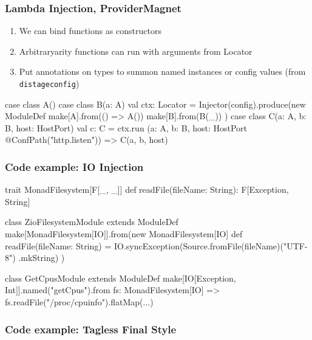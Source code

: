 \documentclass[usenames,dvipsnames]{beamer}
\begin{document}
\begin{frame}[fragile]
\frametitle{Lambda Injection, ProviderMagnet}
\begin{enumerate}
\item We can bind functions as constructors
\item Arbitrary\-arity functions can run with arguments from Locator
\item Put annotations on types to summon named instances or config values (from \texttt{distage\-config})
\end{enumerate}
\begin{scalacode}
case class A()
case class B(a: A)
val ctx: Locator = Injector(config).produce(new ModuleDef { 
  make[A].from(() => A())
  make[B].from(B(_))
})
case class C(a: A, b: B, host: HostPort)
val c: C = ctx.run {
  (a: A, b: B, host: HostPort @ConfPath("http.listen")) =>
    C(a, b, host)
}
\end{scalacode}
\end{frame}

\begin{frame}[fragile]
\frametitle{Code example: IO Injection}
\begin{enumerate}
\begin{scalacode}
trait MonadFilesystem[F[_, _]] {
  def readFile(fileName: String): F[Exception, String]
}

class ZioFilesystemModule extends ModuleDef {
  make[MonadFilesystem[IO]].from(new MonadFilesystem[IO] {
    def readFile(fileName: String) = 
      IO.syncException(Source.fromFile(fileName)("UTF-8")
        .mkString) 
  })
}

class GetCpusModule extends ModuleDef {
  make[IO[Exception, Int]].named("getCpus").from {
    fs: MonadFilesystem[IO] =>
      fs.readFile("/proc/cpuinfo").flatMap(...)
  }
}
\end{scalacode}
\end{enumerate}
\end{frame}

\begin{frame}[fragile]
\frametitle{Code example: Tagless Final Style}
\begin{enumerate}


\end{enumerate}
\end{frame}
\end{document}
